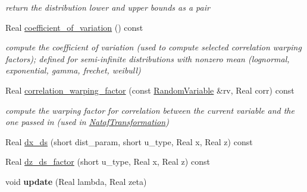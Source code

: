 \begin{DoxyCompactItemize}
\begin{DoxyCompactList}\small\item\em return the distribution lower and upper bounds as a pair \end{DoxyCompactList}\item 
Real \hyperlink{classPecos_1_1LognormalRandomVariable_ae1cf1c07047d7ad9dbb899aa01138d54}{coefficient\+\_\+of\+\_\+variation} () const 
\begin{DoxyCompactList}\small\item\em compute the coefficient of variation (used to compute selected correlation warping factors); defined for semi-\/infinite distributions with nonzero mean (lognormal, exponential, gamma, frechet, weibull) \end{DoxyCompactList}\item 
Real \hyperlink{classPecos_1_1LognormalRandomVariable_a9ee48b3ca93459136b2e73f77873c4aa}{correlation\+\_\+warping\+\_\+factor} (const \hyperlink{classPecos_1_1RandomVariable}{Random\+Variable} \&rv, Real corr) const \label{classPecos_1_1LognormalRandomVariable_a9ee48b3ca93459136b2e73f77873c4aa}

\begin{DoxyCompactList}\small\item\em compute the warping factor for correlation between the current variable and the one passed in (used in \hyperlink{classPecos_1_1NatafTransformation}{Nataf\+Transformation}) \end{DoxyCompactList}\item 
Real \hyperlink{classPecos_1_1LognormalRandomVariable_af889af8adfb262c9b74f573b2a9ffc99}{dx\+\_\+ds} (short dist\+\_\+param, short u\+\_\+type, Real x, Real z) const 
\item 
Real \hyperlink{classPecos_1_1LognormalRandomVariable_af6b5fc528523180bed5fc3008dcea205}{dz\+\_\+ds\+\_\+factor} (short u\+\_\+type, Real x, Real z) const 
\item 
void {\bfseries update} (Real lambda, Real zeta)\label{classPecos_1_1LognormalRandomVariable_ac4eb88bb978b104899ccdb80c58aa6c5}

\end{DoxyCompactItemize}
